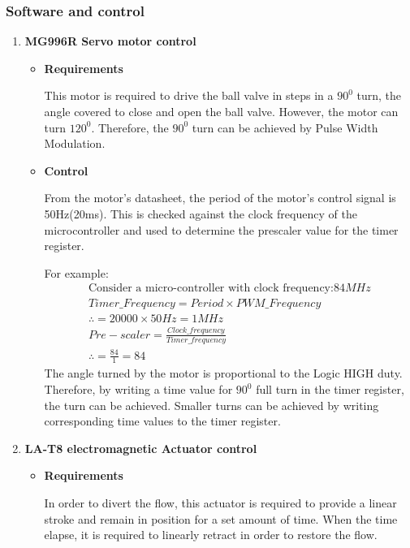 \subsubsection{Software and control}

\begin{enumerate}
    \item \textbf{MG996R Servo motor control}
    \par
    \begin{itemize}
        \item \textbf{Requirements}
        \par
        This motor is required to drive the ball valve in steps in a $90^{0}$ turn, the angle covered to close and open the ball valve. However, the motor can turn $120^{0}$. Therefore, the $90^{0}$ turn can be achieved by Pulse Width Modulation. 
        \item \textbf{Control}
        \par
        From the motor's datasheet, the period of the motor's control signal is 50Hz(20ms). This is checked against the clock frequency of the microcontroller and used to determine the prescaler value for the timer register.
        \par
        For example:
        \begin{align*}
            \text{Consider a micro-controller with clock frequency:} 84MHz \\
            Timer\_Frequency = Period \times PWM\_Frequency\\
            \therefore = 20000 \times 50 Hz  = 1MHz\\
            Pre-scaler = \frac{Clock\_frequency}{Timer\_frequency}\\
            \therefore = \frac{84}{1} = 84
        \end{align*}
        The angle turned by the motor is proportional to the Logic HIGH duty. Therefore, by writing a time value for $90^{0}$ full turn in the timer register, the turn can be achieved. Smaller turns can be achieved by writing corresponding time values to the timer register.
    \end{itemize}
    \item \textbf{LA-T8 electromagnetic Actuator control}
    \par
    \begin{itemize}
        \item \textbf{Requirements}
        \par
        In order to divert the flow, this actuator is required to provide a linear stroke and remain in position for a set amount of time. When the time elapse, it is required to linearly retract in order to restore the flow. 

\end{itemize}
\end{enumerate}
